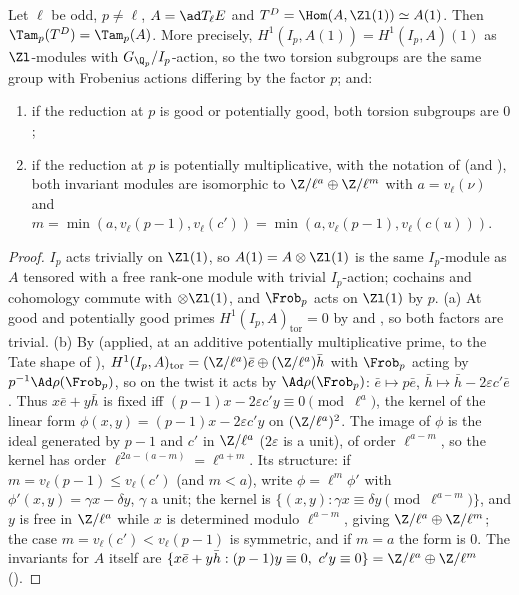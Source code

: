 \begin{proposition}[$\Tam_p(T^D)=\Tam_p(A)$]\label{prop:blochkato:tam-dual}
\sloppy Let $\ell$ be odd, $p\ne\ell$, $A=\ad T_\ell E$ and $T^D=\Hom(A,\Zl(1))\simeq A(1)$. Then $\Tam_p(T^D)=\Tam_p(A)$. More precisely, $H^1(I_p,A(1))=H^1(I_p,A)(1)$ as $\Zl$-modules
with $G_{\Q_p}/I_p$-action, so the two torsion subgroups are the same group with Frobenius actions differing by the factor $p$; and:
\begin{enumerate}[label=(\alph*)]
\item if the reduction at $p$ is good or potentially good, both torsion subgroups are $0$;
\item if the reduction at $p$ is potentially multiplicative, with the notation of  (and ), both invariant
modules are isomorphic to $\Z/\ell^{a}\oplus\Z/\ell^{m}$ with $a=v_\ell(\nu)$ and $m=\min(a,v_\ell(p-1),v_\ell(c'))=\min(a,v_\ell(p-1),v_\ell(c(u)))$.
\end{enumerate}
\end{proposition}

\begin{proof}
$I_p$ acts trivially on $\Zl(1)$, so $A(1)=A\otimes\Zl(1)$ is the same $I_p$-module as $A$ tensored with a free rank-one module with trivial $I_p$-action; cochains and
cohomology commute with $\otimes\Zl(1)$, and $\Frob_p$ acts on $\Zl(1)$ by $p$. (a) At good and potentially good primes $H^1(I_p,A)_{\mathrm{tor}}=0$ by 
and , so both factors are trivial. (b) By  (applied, at an additive potentially multiplicative prime, to the
Tate shape of ), $H^1(I_p,A)_{\mathrm{tor}}=(\Z/\ell^a)\bar e\oplus(\Z/\ell^a)\bar h$ with $\Frob_p$ acting by $p^{-1}\Ad\rho(\Frob_p)$, so on the twist it acts by
$\Ad\rho(\Frob_p)$: $\bar e\mapsto p\bar e$, $\bar h\mapsto\bar h-2\varepsilon c'\bar e$. Thus $x\bar e+y\bar h$ is fixed iff $(p-1)x-2\varepsilon c'y\equiv0\pmod{\ell^a}$, the kernel of the linear form
$\phi(x,y)=(p-1)x-2\varepsilon c'y$ on $(\Z/\ell^a)^2$. The image of $\phi$ is the ideal generated by $p-1$ and $c'$ in $\Z/\ell^a$ ($2\varepsilon$ is a unit), of order $\ell^{a-m}$, so the kernel
has order $\ell^{2a-(a-m)}=\ell^{a+m}$. Its structure: if $m=v_\ell(p-1)\le v_\ell(c')$ (and $m<a$), write $\phi=\ell^m\phi'$ with $\phi'(x,y)=\gamma x-\delta y$, $\gamma$ a unit; the kernel is
$\{(x,y):\gamma x\equiv\delta y\pmod{\ell^{a-m}}\}$, and $y$ is free in $\Z/\ell^a$ while $x$ is determined modulo $\ell^{a-m}$, giving $\Z/\ell^a\oplus\Z/\ell^m$; the case $m=v_\ell(c')<v_\ell(p-1)$ is
symmetric, and if $m=a$ the form is $0$. The invariants for $A$ itself are $\{x\bar e+y\bar h:(p-1)y\equiv0,\ c'y\equiv0\}=\Z/\ell^a\oplus\Z/\ell^m$ ().
\end{proof}

